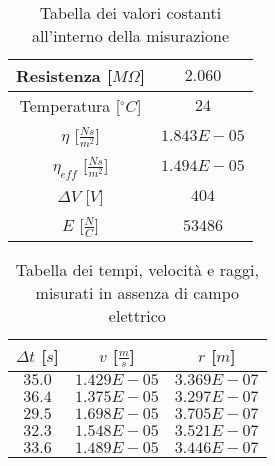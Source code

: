 \documentclass{article}
\begin{document}
\begin{multicols}{2}

\begin{table}[H]
	\centering
	\begin{tabular}{| c | c |}
		\hline
		Resistenza [$M\Omega$] & $2.060$\\
		\hline
		Temperatura [$^\circ C$] & $24$\\
		\hline
		$\eta$ [$\frac{Ns}{m^2}$] & $1.843E-05$\\
		\hline
		$\eta_{eff}$ [$\frac{Ns}{m^2}$] & $1.494E-05$\\
		\hline
		$\Delta V$ [$V$] & $404$\\
		\hline
		$E$ [$\frac N C$] & $53486$\\
		\hline
	\end{tabular}
	\caption{Tabella dei valori costanti all'interno della misurazione}
	\label{}
\end{table}

\columnbreak

\begin{table}[H]
	\centering
	\begin{tabular}{| c | c | c |}
		\hline
		$\Delta t$ [$s$] & $v$ [$\frac ms$] & $r$ [$m$] \\
		\hline
		$35.0$ & $1.429E-05$ & $3.369E-07$ \\
		$36.4$ & $1.375E-05$ & $3.297E-07$ \\
		$29.5$ & $1.698E-05$ & $3.705E-07$ \\
		$32.3$ & $1.548E-05$ & $3.521E-07$ \\
		$33.6$ & $1.489E-05$ & $3.446E-07$ \\
		\hline
	\end{tabular}
	\caption{Tabella dei tempi, velocità e raggi, misurati in assenza di campo elettrico}
	\label{}
\end{table}
	
\end{multicols}
\end{document}
